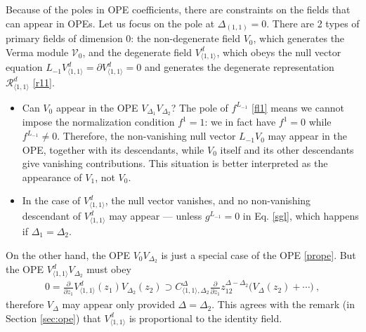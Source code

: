 \documentclass[12pt, a4paper]{article}
\begin{document}
Because of the poles in OPE coefficients, there are constraints on the fields that can appear in OPEs. Let us focus on the pole at $\Delta_{(1,1)}=0$. There are 2 types of primary fields of dimension $0$: the non-degenerate field $V_0$, which generates the Verma module $\mathcal{V}_0$, and the degenerate field $V^d_{\langle 1,1\rangle}$, which obeys the null vector equation $L_{-1}V^d_{\langle 1,1\rangle}=\partial V^d_{\langle 1,1\rangle}=0$ and generates the degenerate representation $\mathcal{R}^d_{\langle 1,1\rangle}$ \eqref{r11}. 
\begin{itemize}
 \item Can $V_0$ appear in the OPE $V_{\Delta_1}V_{\Delta_2}$? The pole of $f^{L_{-1}}$ \eqref{fl1} means we cannot impose the normalization condition $f^1=1$: we in fact have $f^1=0$ while $f^{L_{-1}}\neq 0$. Therefore, the non-vanishing null vector $L_{-1}V_0$ may appear in the OPE, together with its descendants, while $V_0$ itself and its other descendants give vanishing contributions. This situation is better interpreted as the appearance of $V_1$, not $V_0$.  
 \item In the case of $V^d_{\langle 1,1\rangle}$, the null vector vanishes, and no non-vanishing descendant of $V^d_{\langle 1,1\rangle}$ may appear --- unless $g^{L_{-1}}=0$ in Eq. \eqref{sgl}, which happens if $\Delta_1=\Delta_2$.
\end{itemize}
On the other hand, the OPE $V_0V_{\Delta_2}$ is just a special case of the OPE \eqref{prope}.
But the OPE $V^d_{\langle 1,1\rangle}V_{\Delta_2}$ must obey 
\begin{align}
 0 = \frac{\partial}{\partial z_1} V^d_{\langle 1,1\rangle}(z_1)V_{\Delta_2}(z_2) \supset C_{\langle 1,1\rangle,\Delta_2}^{\Delta} \frac{\partial}{\partial z_1} z_{12}^{\Delta-\Delta_2} \big(V_\Delta(z_2) +\cdots \big) \ ,
\end{align}
therefore $V_\Delta$ may appear only provided $\Delta=\Delta_2$. This agrees with the remark (in Section \ref{sec:ope}) that $V^d_{\langle 1,1\rangle}$ is proportional to the identity field. 
\end{document}
